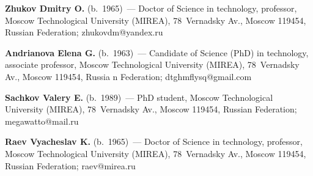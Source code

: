 \vspace*{3pt}

\noindent
\textbf{Zhukov Dmitry O.} (b.\ 1965)~--- Doctor of Science in technology, 
professor, Moscow Technological University (MIREA), 78~Vernadsky Av., 
Moscow 119454, Russian Federation; \mbox{zhukovdm@yandex.ru}

\vspace*{3pt}

\noindent
\textbf{Andrianova Elena G.} (b.\ 1963)~--- Candidate of Science (PhD) in 
technology, associate professor, Moscow Technological University (MIREA), 
78~Vernadsky Av., Moscow 119454, Russia n Federation; 
\mbox{dtghmflysq@gmail.com}

\vspace*{3pt}

\noindent
\textbf{Sachkov Valery E.} (b.\ 1989)~--- PhD student, Moscow Technological 
University (MIREA), 78~Vernadsky Av., Moscow 119454, Russian Federation; 
\mbox{megawatto@mail.ru}

\vspace*{3pt}

\noindent
\textbf{Raev Vyacheslav K.} (b.\ 1965)~--- Doctor of Science in technology, 
professor, Moscow Technological University (MIREA), 78~Vernadsky Av., 
Moscow 119454, Russian Federation; \mbox{raev@mirea.ru}

\label{end\stat}


\renewcommand{\bibname}{\protect\rm Литература} 
  